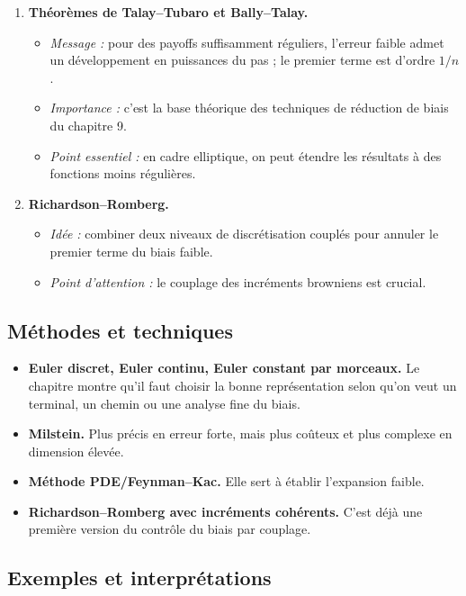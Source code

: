 \documentclass[11pt,a4paper]{article}
\begin{document}
\begin{enumerate}[label=\textbf{\arabic*.}]
  \item \textbf{Théorèmes de Talay--Tubaro et Bally--Talay.}
  \begin{itemize}
    \item \emph{Message :} pour des payoffs suffisamment réguliers, l'erreur faible admet un développement en puissances du pas ; le premier terme est d'ordre $1/n$.
    \item \emph{Importance :} c'est la base théorique des techniques de réduction de biais du chapitre 9.
    \item \emph{Point essentiel :} en cadre elliptique, on peut étendre les résultats à des fonctions moins régulières.
  \end{itemize}

  \item \textbf{Richardson--Romberg.}
  \begin{itemize}
    \item \emph{Idée :} combiner deux niveaux de discrétisation couplés pour annuler le premier terme du biais faible.
    \item \emph{Point d'attention :} le couplage des incréments browniens est crucial.
  \end{itemize}
\end{enumerate}

\subsection{Méthodes et techniques}

\begin{itemize}
  \item \textbf{Euler discret, Euler continu, Euler constant par morceaux.} Le chapitre montre qu'il faut choisir la bonne représentation selon qu'on veut un terminal, un chemin ou une analyse fine du biais.
  \item \textbf{Milstein.} Plus précis en erreur forte, mais plus coûteux et plus complexe en dimension élevée.
  \item \textbf{Méthode PDE/Feynman--Kac.} Elle sert à établir l'expansion faible.
  \item \textbf{Richardson--Romberg avec incréments cohérents.} C'est déjà une première version du contrôle du biais par couplage.
\end{itemize}

\subsection{Exemples et interprétations}
\end{document}
